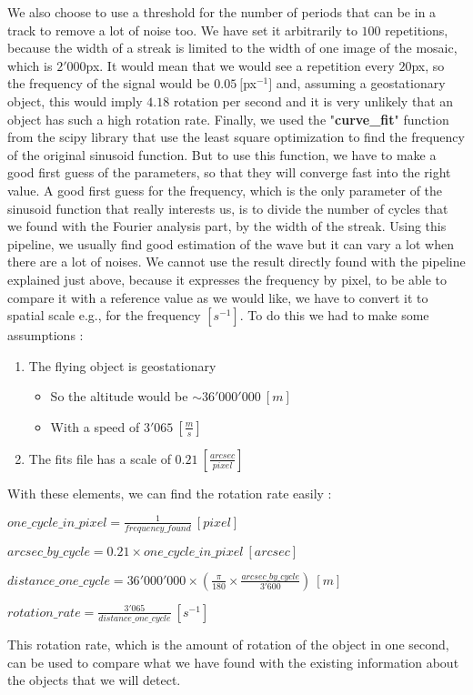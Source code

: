 \documentclass[a4paper,12pt,oneside]{report}
\begin{document}
We also choose to use a threshold for the number of periods that can be in a track to remove a lot of noise too. 
We have set it arbitrarily to $100$ repetitions, because the width of a streak is limited to the width of one image of the mosaic, which is 
$2'000$px. It would mean that we would see a repetition every $20$px, so the frequency of the signal would be $0.05\ [$px$^{-1}]$ and,
assuming a geostationary object, this would imply $4.18$ rotation per second and it is very unlikely that an object has such a high 
rotation rate.
\newline
\newline
Finally, we used the "\textbf{curve\_fit}" function from the scipy library that use the least square optimization \cite{leastSquare} to find the frequency of the
original sinusoid function. But to use this function, we have to make a good first guess of the parameters, so that they will converge 
fast into the right value. A good first guess for the frequency, which is the only parameter of the sinusoid function that really interests us, is to 
divide the number of cycles that we found with the Fourier analysis part, by the width of the streak. 
\newline
Using this pipeline, we usually find good estimation of the wave but it can vary a lot when there are a lot of noises.
\newline
\newline
We cannot use the result directly found with the pipeline explained just above, because it expresses the frequency by pixel, to be able to
compare it with a reference value as we would like, we have to convert it to spatial scale e.g., for the frequency $[s^{-1}]$. To do this
we had to make some assumptions : 
\begin{enumerate}
    \item The flying object is geostationary
    \begin{itemize}
    \item So the altitude would be $\sim 36'000'000\ [m]$
    \item With a speed of $3'065\ [\frac{m}{s}]$
    \end{itemize}
    \item The fits file has a scale of $0.21\ [\frac{arcsec}{pixel}]$
\end{enumerate}
With these elements, we can find the rotation rate easily :
\begin{center}
$one\_cycle\_in\_pixel = \frac{1}{frequency\_found}\ [pixel]$

$arcsec\_by\_cycle = 0.21 \times one\_cycle\_in\_pixel\ [arcsec]$

$distance\_one\_cycle = 36'000'000 \times (\frac{\pi}{180} \times \frac{arcsec\_by\_cycle}{3'600})\ [m]$

$rotation\_rate = \frac{3'065}{distance\_one\_cycle}\ [s^{-1}]$
\end{center}
This rotation rate, which is the amount of rotation of the object in one second, can be used to compare what we have found with 
the existing information about the objects that we will detect.
\end{document}

